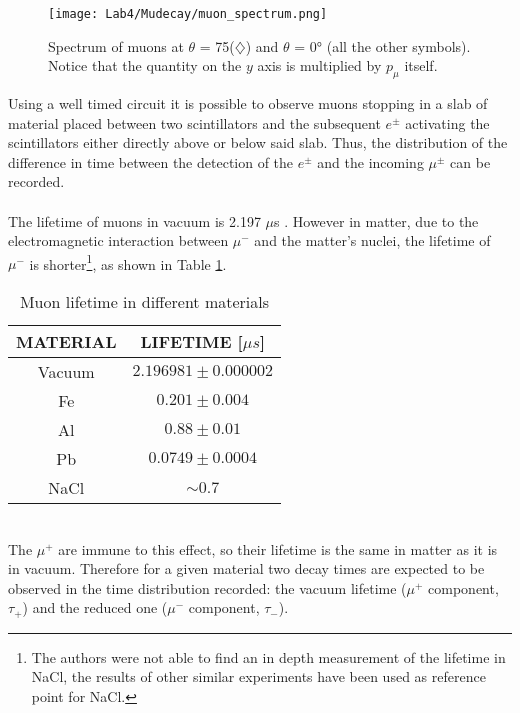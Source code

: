 \documentclass[10pt,a4paper,twocolumn]{article}
\begin{document}
\begin{figure}[h!]
\centering
\texttt{[image: Lab4/Mudecay/muon\_spectrum.png]} 
\caption{Spectrum of muons at $\theta$ = 75\degree ($\diamondsuit$) and $\theta$ = 0° (all the other symbols). Notice that the quantity on the $y$ axis is multiplied by $p_\mu$ itself. \cite{PDG_spectrum}}
\label{muspectrum}
\end{figure}

Using a well timed circuit it is possible to observe muons stopping in a slab of material placed between two scintillators and the subsequent $e^{\pm}$ activating the scintillators either directly above or below said slab. Thus, the distribution of the difference in time between the detection of the $e^\pm$ and the incoming $\mu^\pm$ can be recorded.
\\
\\
The lifetime of muons in vacuum is 2.197 $\mu$s \cite{PDGtau}. However in matter, due to the electromagnetic interaction between $\mu^-$ and the matter's nuclei, the lifetime of $\mu^-$ is shorter\footnote{The authors were not able to find an in depth measurement of the lifetime in NaCl, the results of other similar experiments have been used as reference point for NaCl.}, as shown in Table \ref{mulifetimematerials}.



\begin{table}[h]
\centering
\begin{tabular}{|c|c|}
\hline
MATERIAL & LIFETIME [$\mu s$]   \\
\hline
Vacuum & $2.196981 \pm 0.000002$ \\
Fe &  $0.201 \pm 0.004$   \\
Al &  $0.88 \pm 0.01$  \\
Pb &  $0.0749 \pm 0.0004$   \\
NaCl &  $\sim 0.7$   \\
\hline
\end{tabular} 
\caption{Muon lifetime in different materials }
\label{mulifetimematerials}
\end{table}

\\
The $\mu^+$ are immune to this effect, so their lifetime is the same in matter as it is in vacuum. Therefore for a given material two decay times are expected to be observed in the time distribution recorded: the vacuum lifetime ($\mu^+$ component, $\tau_+$) and the reduced one ($\mu^-$ component, $\tau_-$).
\\
\end{document}
